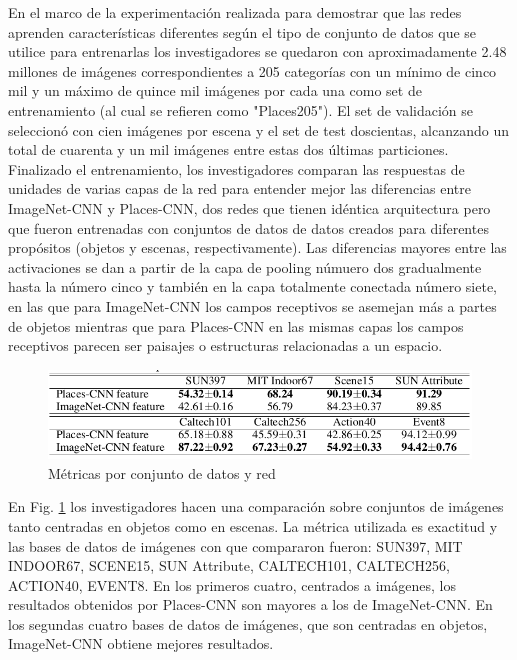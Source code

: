 En el marco de la experimentación realizada para demostrar que las redes aprenden características diferentes según el tipo de conjunto de datos que se utilice para entrenarlas los investigadores se quedaron con aproximadamente 2.48 millones de imágenes correspondientes a 205 categorías con un mínimo de cinco mil y un máximo de quince mil imágenes por cada una como set de entrenamiento (al cual se refieren como "Places205"). El set de validación se seleccionó con cien imágenes por escena y el set de test doscientas, alcanzando un total de cuarenta y un mil imágenes entre estas dos últimas particiones. 
Finalizado el entrenamiento, los investigadores comparan las respuestas de unidades de varias capas de la red para entender mejor las diferencias entre ImageNet-CNN y Places-CNN, dos redes que tienen idéntica arquitectura pero que fueron entrenadas con conjuntos de datos de datos creados para diferentes propósitos (objetos y escenas, respectivamente). Las diferencias mayores entre las activaciones se dan a partir de la capa de pooling númuero dos gradualmente hasta la número cinco y también en la capa totalmente conectada número siete, en las que para ImageNet-CNN los campos receptivos se asemejan más a partes de objetos mientras que para Places-CNN en las mismas capas los campos receptivos parecen ser paisajes o estructuras relacionadas a un espacio. 
\begin{figure}[h!]
	\centering
	\includegraphics[width=1\linewidth]{images/places_metrics}
	\caption[Métricas por conjunto de datos y red]{Métricas por conjunto de datos y red}
	\label{fig:placesmetrics}
\end{figure}
En Fig. \ref{fig:placesmetrics} los investigadores hacen una comparación sobre conjuntos de imágenes tanto centradas en objetos como en escenas. La métrica utilizada es exactitud y las bases de datos de imágenes con que compararon fueron: SUN397, MIT INDOOR67, SCENE15, SUN Attribute, CALTECH101, CALTECH256, ACTION40, EVENT8. En los primeros cuatro, centrados a imágenes, los resultados obtenidos por Places-CNN son mayores a los de ImageNet-CNN. En los segundas cuatro bases de datos de imágenes, que son centradas en objetos, ImageNet-CNN obtiene mejores resultados. 


